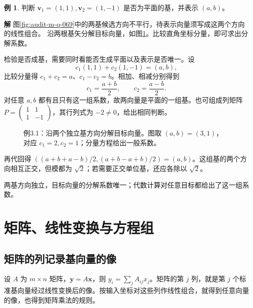\documentclass[11pt,openany,fontset=fandol]{ctexbook}
\theoremstyle{plain}\newtheorem{theorem}{定理}[chapter]\newtheorem{proposition}[theorem]{命题}
\theoremstyle{definition}\newtheorem{definition}{定义}[chapter]\newtheorem{example}{例}[chapter]
\theoremstyle{remark}\newtheorem*{remark}{说明}
\newcommand{\SolutionStart}{\par\nobreak\medskip\nobreak\noindent\textbf{解}\quad\ignorespaces}
\newenvironment{solution}{\SolutionStart}{\par\medskip}
\newcommand{\vct}[1]{\bm{#1}}\newcommand{\Rea}{\operatorname{Re}}\newcommand{\Ima}{\operatorname{Im}}
\begin{document}
\begin{example}
判断 $\vct v_1=(1,1),\vct v_2=(1,-1)$ 是否为平面的基，并表示 $(a,b)$。
\end{example}

\begin{solution}
图\ref{fig:audit-m-q-069}中的两基候选方向不平行，待表示向量须写成这两个方向的线性组合。
沿两根基矢分解目标向量，如图\ref{fig:eg-3-1}。比较直角坐标分量，即可求出分解系数。

检验是否成基，需要同时看能否生成平面以及表示是否唯一。设
\[
c_1(1,1)+c_2(1,-1)=(a,b),
\]
比较分量得 $c_1+c_2=a$、$c_1-c_2=b$。相加、相减分别得到
\[
c_1=\frac{a+b}{2},\qquad c_2=\frac{a-b}{2}.
\]
对任意 $a,b$ 都有且只有这一组系数，故两向量是平面的一组基。也可组成列矩阵 $P=\begin{pmatrix}1&1\\1&-1\end{pmatrix}$，其行列式为 $-2\ne0$，给出相同判断。

\begin{figure}[H]\centering
{}
\caption{例3.1：沿两个独立基方向分解目标向量。图取 $(a,b)=(3,1)$，对应 $c_1=2,c_2=1$；分量方程给出一般系数。}\label{fig:eg-3-1}
\end{figure}

再代回得 $((a+b+a-b)/2,(a+b-a+b)/2)=(a,b)$。这组基的两个方向相互正交，但模都为 $\sqrt2$；若需要正交单位基，还应各除以 $\sqrt2$。

两基方向独立，目标向量的分解系数唯一；代数计算对任意目标都给出了这一组系数。
\end{solution}

\section{矩阵、线性变换与方程组}
\subsection{矩阵的列记录基向量的像}
设 $A$ 为 $m\times n$ 矩阵，$\vct y=A\vct x$，则 $y_i=\sum_jA_{ij}x_j$。矩阵的第 $j$ 列，就是第 $j$ 个标准基向量经过线性变换后的像。按输入坐标对这些列作线性组合，就得到任意向量的像，也得到矩阵乘法的规则。
\end{document}
